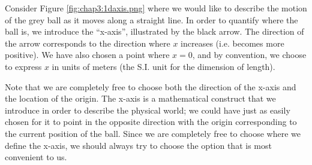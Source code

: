 Consider Figure \ref{fig:chap3:1daxis.png} where we would like to describe the motion of the grey ball as it moves along a straight line. In order to quantify where the ball is, we introduce the ``x-axis'', illustrated by the black arrow. The direction of the arrow corresponds to the direction where $x$ increases (i.e. becomes more positive). We have also chosen a point where $x=0$, and by convention, we choose to express $x$ in units of meters (the S.I. unit for the dimension of length).

Note that we are completely free to choose both the direction of the x-axis and the location of the origin. The x-axis is a mathematical construct that we introduce in order to describe the physical world; we could have just as easily chosen for it to point in the opposite direction with the origin corresponding to the current position of the ball. Since we are completely free to choose where we define the x-axis, we should always try to choose the option that is most convenient to us. 

